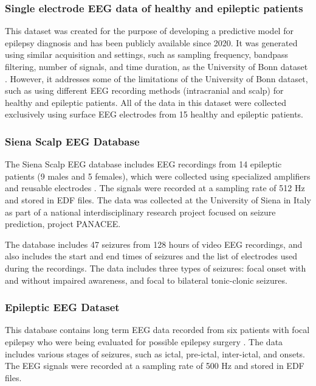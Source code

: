 \subsubsection{Single electrode EEG data of healthy and epileptic patients}
This dataset was created for the purpose of developing a predictive model for epilepsy diagnosis and has been publicly available since 2020. It was generated using similar acquisition and settings, such as sampling frequency, bandpass filtering, number of signals, and time duration, as the University of Bonn dataset \cite{panwar_automated_2019, panwar_single_2020}. 
However, it addresses some of the limitations of the University of Bonn dataset, such as using different \gls{EEG} recording methods (intracranial and scalp) for healthy and epileptic patients. All of the data in this dataset were collected exclusively using surface \gls{EEG} electrodes from 15 healthy and epileptic patients.

\subsubsection{Siena Scalp EEG Database}
The Siena Scalp EEG database includes \gls{EEG} recordings from 14 epileptic patients (9 males and 5 females), which were collected using specialized amplifiers and reusable electrodes \cite{detti_eeg_2020, detti_paolo_siena_2020}. The signals were recorded at a sampling rate of 512 Hz and stored in EDF files. The data was collected at the University of Siena in Italy as part of a national interdisciplinary research project focused on seizure prediction, project PANACEE. 

The database includes 47 seizures from 128 hours of video \gls{EEG} recordings, and also includes the start and end times of seizures and the list of electrodes used during the recordings. The data includes three types of seizures: focal onset with and without impaired awareness, and focal to bilateral tonic-clonic seizures.

\subsubsection{Epileptic EEG Dataset}
This database contains long term \gls{EEG} data recorded from six patients with focal epilepsy who were being evaluated for possible epilepsy surgery \cite{nasreddine_epileptic_2021}. The data includes various stages of seizures, such as ictal, pre-ictal, inter-ictal, and onsets. The \gls{EEG} signals were recorded at a sampling rate of 500 Hz and stored in \gls{EDF} files. 

